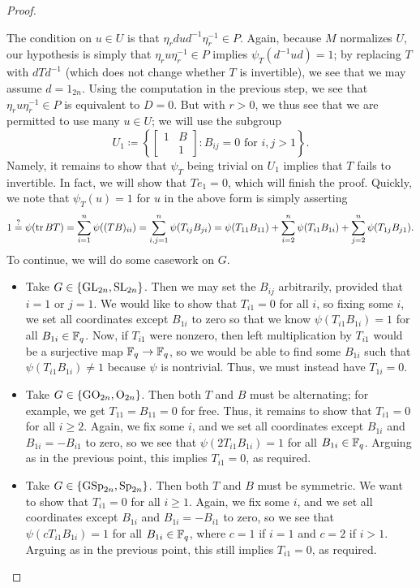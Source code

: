 \begin{proof}
\begin{enumerate}
		The condition on $u\in U$ is that $\eta_rdud^{-1}\eta_r^{-1}\in P$. Again, because $M$ normalizes $U$, our hypothesis is simply that $\eta_ru\eta_r^{-1}\in P$ implies $\psi_T\left(d^{-1}ud\right)=1$; by replacing $T$ with $dTd^{-1}$ (which does not change whether $T$ is invertible), we see that we may assume $d=1_{2n}$. Using the computation in the previous step, we see that $\eta_ru\eta_r^{-1}\in P$ is equivalent to $D=0$. But with $r>0$, we thus see that we are permitted to use many $u\in U$; we will use the subgroup
		\[U_1\coloneqq\left\{\begin{bmatrix}
			1 & B \\ & 1
		\end{bmatrix}:B_{ij}=0\text{ for }i,j>1\right\}.\]
		Namely, it remains to show that $\psi_T$ being trivial on $U_1$ implies that $T$ fails to invertible. In fact, we will show that $Te_1=0$, which will finish the proof. Quickly, we note that $\psi_T(u)=1$ for $u$ in the above form is simply asserting
		\[1\stackrel?=\psi(\operatorname{tr} BT)=\sum_{i=1}^n\psi((TB)_{ii})=\sum_{i,j=1}^n\psi(T_{ij}B_{ji})=\psi(T_{11}B_{11})+\sum_{i=2}^n\psi(T_{i1}B_{1i})+\sum_{j=2}^n\psi(T_{1j}B_{j1}).\]
		To continue, we will do some casework on $G$.
		\begin{itemize}
			\item Take $G\in\{\mathrm{GL}_{2n},\mathrm{SL}_{2n}\}$. Then we may set the $B_{ij}$ arbitrarily, provided that $i=1$ or $j=1$. We would like to show that $T_{i1}=0$ for all $i$, so fixing some $i$, we set all coordinates except $B_{1i}$ to zero so that we know $\psi(T_{i1}B_{1i})=1$ for all $B_{1i}\in\mathbb F_q$. Now, if $T_{i1}$ were nonzero, then left multiplication by $T_{i1}$ would be a surjective map $\mathbb F_q\to\mathbb F_q$, so we would be able to find some $B_{1i}$ such that $\psi(T_{i1}B_{1i})\ne1$ because $\psi$ is nontrivial. Thus, we must instead have $T_{1i}=0$.
			\item Take $G\in\{\mathrm{GO}_{2n},\mathrm{O}_{2n}\}$. Then both $T$ and $B$ must be alternating; for example, we get $T_{11}=B_{11}=0$ for free. Thus, it remains to show that $T_{i1}=0$ for all $i\ge2$. Again, we fix some $i$, and we set all coordinates except $B_{1i}$ and $B_{1i}=-B_{i1}$ to zero, so we see that $\psi(2T_{i1}B_{1i})=1$ for all $B_{1i}\in\mathbb F_q$. Arguing as in the previous point, this implies $T_{i1}=0$, as required.
			\item Take $G\in\{\mathrm{GSp}_{2n},\mathrm{Sp}_{2n}\}$. Then both $T$ and $B$ must be symmetric. We want to show that $T_{i1}=0$ for all $i\ge1$. Again, we fix some $i$, and we set all coordinates except $B_{1i}$ and $B_{1i}=-B_{i1}$ to zero, so we see that $\psi(cT_{i1}B_{1i})=1$ for all $B_{1i}\in\mathbb F_q$, where $c=1$ if $i=1$ and $c=2$ if $i>1$. Arguing as in the previous point, this still implies $T_{i1}=0$, as required.
		\end{itemize}


\end{enumerate}
\end{proof}
